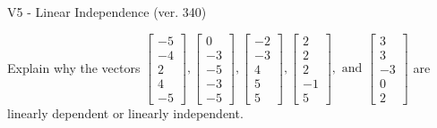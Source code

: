 \begin{exercise}
  \begin{exerciseTitle}V5 - Linear Independence (ver. 340)\end{exerciseTitle}
  \begin{exerciseStatement}
    Explain why the vectors \(\left[\begin{array}{r}
-5 \\
-4 \\
2 \\
4 \\
-5
\end{array}\right] , \left[\begin{array}{r}
0 \\
-3 \\
-5 \\
-3 \\
-5
\end{array}\right] , \left[\begin{array}{r}
-2 \\
-3 \\
4 \\
5 \\
5
\end{array}\right] , \left[\begin{array}{r}
2 \\
2 \\
2 \\
-1 \\
5
\end{array}\right] , \text{ and } \left[\begin{array}{r}
3 \\
3 \\
-3 \\
0 \\
2
\end{array}\right]\) are linearly dependent or linearly independent.	



\end{exerciseStatement}
\end{exercise}
